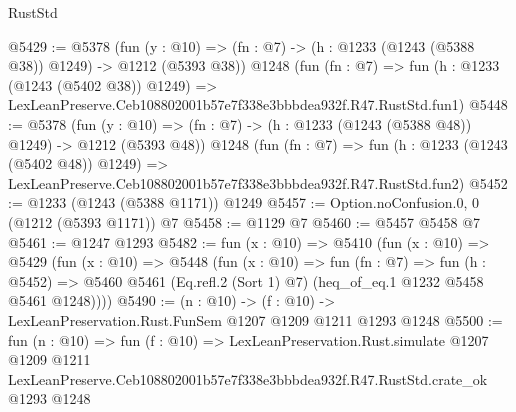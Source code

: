 \begin{lexlean}{RustStd}
\begin{coremodule}
@5429 := @5378
    (fun (y : @10) => (fn : @7) -> (h : @1233 (@1243 (@5388 @38)) @1249) -> @1212 (@5393 @38))
    @1248
    (fun (fn : @7) =>
    fun (h : @1233 (@1243 (@5402 @38)) @1249) =>
    LexLeanPreserve.Ceb108802001b57e7f338e3bbbdea932f.R47.RustStd.fun1)
@5448 := @5378
    (fun (y : @10) => (fn : @7) -> (h : @1233 (@1243 (@5388 @48)) @1249) -> @1212 (@5393 @48))
    @1248
    (fun (fn : @7) =>
    fun (h : @1233 (@1243 (@5402 @48)) @1249) =>
    LexLeanPreserve.Ceb108802001b57e7f338e3bbbdea932f.R47.RustStd.fun2)
@5452 := @1233 (@1243 (@5388 @1171)) @1249
@5457 := Option.noConfusion.{0, 0} (@1212 (@5393 @1171)) @7
@5458 := @1129 @7
@5460 := @5457 @5458 @7
@5461 := @1247 @1293
@5482 := fun (x : @10) =>
  @5410
    (fun (x : @10) =>
    @5429
      (fun (x : @10) =>
      @5448
        (fun (x : @10) =>
        fun (fn : @7) =>
        fun (h : @5452) =>
        @5460 @5461 (Eq.refl.{2} (Sort 1) @7) (heq_of_eq.{1} @1232 @5458 @5461 @1248))))
@5490 := (n : @10) -> (f : @10) -> LexLeanPreservation.Rust.FunSem @1207 @1209 @1211 @1293 @1248
@5500 := fun (n : @10) =>
  fun (f : @10) =>
  LexLeanPreservation.Rust.simulate
    @1207
    @1209
    @1211
    LexLeanPreserve.Ceb108802001b57e7f338e3bbbdea932f.R47.RustStd.crate_ok
    @1293
    @1248
\end{coremodule}
\end{lexlean}
